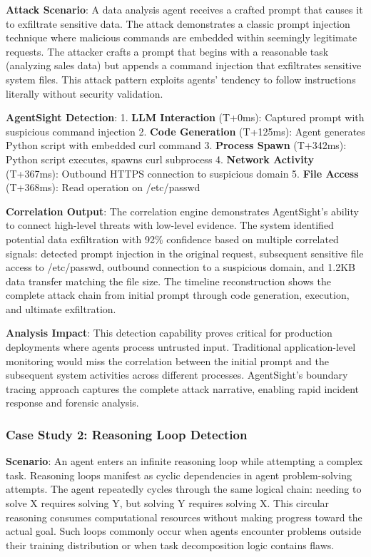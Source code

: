 \textbf{Attack Scenario}: A data analysis agent receives a crafted prompt that causes it to exfiltrate sensitive data. The attack demonstrates a classic prompt injection technique where malicious commands are embedded within seemingly legitimate requests. The attacker crafts a prompt that begins with a reasonable task (analyzing sales data) but appends a command injection that exfiltrates sensitive system files. This attack pattern exploits agents' tendency to follow instructions literally without security validation.

\textbf{AgentSight Detection}:
1. \textbf{LLM Interaction} (T+0ms): Captured prompt with suspicious command injection
2. \textbf{Code Generation} (T+125ms): Agent generates Python script with embedded curl command
3. \textbf{Process Spawn} (T+342ms): Python script executes, spawns curl subprocess
4. \textbf{Network Activity} (T+367ms): Outbound HTTPS connection to suspicious domain
5. \textbf{File Access} (T+368ms): Read operation on /etc/passwd

\textbf{Correlation Output}: The correlation engine demonstrates AgentSight's ability to connect high-level threats with low-level evidence. The system identified potential data exfiltration with 92\% confidence based on multiple correlated signals: detected prompt injection in the original request, subsequent sensitive file access to /etc/passwd, outbound connection to a suspicious domain, and 1.2KB data transfer matching the file size. The timeline reconstruction shows the complete attack chain from initial prompt through code generation, execution, and ultimate exfiltration.

\textbf{Analysis Impact}: This detection capability proves critical for production deployments where agents process untrusted input. Traditional application-level monitoring would miss the correlation between the initial prompt and the subsequent system activities across different processes. AgentSight's boundary tracing approach captures the complete attack narrative, enabling rapid incident response and forensic analysis.

\subsubsection{Case Study 2: Reasoning Loop Detection}

\textbf{Scenario}: An agent enters an infinite reasoning loop while attempting a complex task. Reasoning loops manifest as cyclic dependencies in agent problem-solving attempts. The agent repeatedly cycles through the same logical chain: needing to solve X requires solving Y, but solving Y requires solving X. This circular reasoning consumes computational resources without making progress toward the actual goal. Such loops commonly occur when agents encounter problems outside their training distribution or when task decomposition logic contains flaws.

